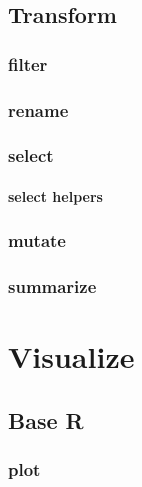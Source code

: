 \documentclass[
  12pt,
]{book}
\begin{document}
\hypertarget{transform-1}{%
\chapter{Transform}\label{transform-1}}

\hypertarget{filter}{%
\section{filter}\label{filter}}

\hypertarget{rename}{%
\section{rename}\label{rename}}

\hypertarget{select}{%
\section{select}\label{select}}

\hypertarget{select-helpers}{%
\subsection{select helpers}\label{select-helpers}}

\hypertarget{mutate}{%
\section{mutate}\label{mutate}}

\hypertarget{summarize}{%
\section{summarize}\label{summarize}}

\hypertarget{part-visualize}{%
\part{Visualize}\label{part-visualize}}

\hypertarget{base-r}{%
\chapter{Base R}\label{base-r}}

\hypertarget{plot}{%
\section{plot}\label{plot}}
\end{document}
